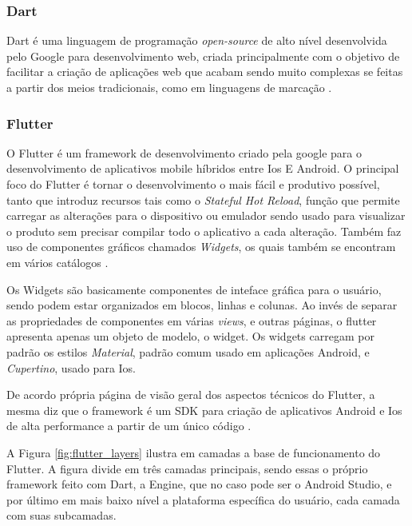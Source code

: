 \subsubsection{Dart}

Dart é uma linguagem de programação \textit{open-source} de alto nível desenvolvida pelo Google para desenvolvimento web, criada principalmente com o objetivo de facilitar a criação de aplicações web que acabam sendo muito complexas se feitas a partir dos meios tradicionais, como em linguagens de marcação \citep{dart_walratb_ladd_2012}.%

\subsubsection{Flutter}
O Flutter é um framework de desenvolvimento criado pela google para o desenvolvimento de aplicativos mobile híbridos entre Ios E Android. O principal foco do Flutter é tornar o desenvolvimento o mais fácil e produtivo possível, tanto que introduz recursos tais como o \textit{Stateful Hot Reload}, função que permite carregar as alterações para o dispositivo ou emulador sendo usado para visualizar o produto sem precisar compilar todo o aplicativo a cada alteração. Também faz uso de componentes gráficos chamados \textit{Widgets}, os quais também se encontram em vários catálogos \citep{flutter_guide_2019}.

Os Widgets são basicamente componentes de inteface gráfica para o usuário, sendo podem estar organizados em blocos, linhas e colunas. Ao invés de separar as propriedades de componentes em várias \textit{views}, e outras páginas, o flutter apresenta apenas um objeto de modelo, o widget. Os widgets carregam por padrão os estilos \textit{Material}, padrão comum usado em aplicações Android, e \textit{Cupertino}, usado para Ios.

De acordo própria página de visão geral dos aspectos técnicos do Flutter, a mesma diz que o framework é um SDK para criação de aplicativos Android e Ios de alta performance a partir de um único código \citep{tec_ov_flutter}.

A Figura \ref{fig:flutter_layers} ilustra em camadas a base de funcionamento do Flutter. A figura divide em três camadas principais, sendo essas o próprio framework feito com Dart, a Engine, que no caso pode ser o Android Studio, e por último em mais baixo nível a plataforma específica do usuário, cada camada com suas subcamadas.

